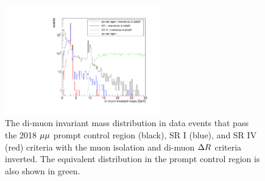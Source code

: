 \begin{figure}
\centering
\includegraphics[width=0.6\textwidth]{figures/bg/mumuInvMass_comparison.pdf}
\caption{The di-muon invariant mass distribution in data events that pass the 2018 ${\mu}{\mu}$ prompt control region (black), SR I (blue), and SR IV (red) criteria with the muon isolation and di-muon $\Delta R$ criteria inverted. The equivalent distribution in the prompt control region is also shown in green.}
\label{mumu_inv_mass_inverted_iso_lo}
\end{figure}